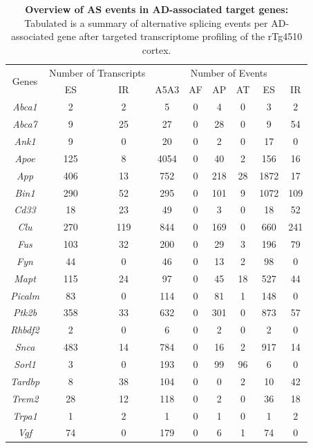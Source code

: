 \begin{table}[]
	\centering
	\captionsetup{width=0.95\textwidth}
	\caption[Overview of AS events in AD-associated target genes]%
	{\textbf{Overview of AS events in AD-associated target genes:} Tabulated is a summary of alternative splicing events per AD-associated gene after targeted transcriptome profiling of the rTg4510 cortex.}
	\label{tab: merged_targeted_ASevents}
	\setlength\tabcolsep{9pt} %
	\begin{tabular}{@{}ccccccccc@{}}
		\toprule
		\multirow{2}{*}{Genes} & \multicolumn{2}{c}{Number of  Transcripts} & \multicolumn{6}{c}{Number of Events} \\ \cmidrule(l){2-9} 
		& ES  & IR  & A5A3 & AF & AP  & AT & ES   & IR  \\ \midrule
		\textit{Abca1}  & 2   & 2   & 5    & 0  & 4   & 0  & 3    & 2   \\
		\textit{Abca7}  & 9   & 25  & 27   & 0  & 28  & 0  & 9    & 54  \\
		\textit{Ank1}   & 9   & 0   & 20   & 0  & 2   & 0  & 17   & 0   \\
		\textit{Apoe}   & 125 & 8   & 4054 & 0  & 40  & 2  & 156  & 16  \\
		\textit{App}    & 406 & 13  & 752  & 0  & 218 & 28 & 1872 & 17  \\
		\textit{Bin1}   & 290 & 52  & 295  & 0  & 101 & 9  & 1072 & 109 \\
		\textit{Cd33}   & 18  & 23  & 49   & 0  & 3   & 0  & 18   & 52  \\
		\textit{Clu}    & 270 & 119 & 844  & 0  & 169 & 0  & 660  & 241 \\
		\textit{Fus}    & 103 & 32  & 200  & 0  & 29  & 3  & 196  & 79  \\
		\textit{Fyn}    & 44  & 0   & 46   & 0  & 13  & 2  & 98   & 0   \\
		\textit{Mapt}   & 115 & 24  & 97   & 0  & 45  & 18 & 527  & 44  \\
		\textit{Picalm} & 83  & 0   & 114  & 0  & 81  & 1  & 148  & 0   \\
		\textit{Ptk2b}  & 358 & 33  & 632  & 0  & 301 & 0  & 873  & 57  \\
		\textit{Rhbdf2} & 2   & 0   & 6    & 0  & 2   & 0  & 2    & 0   \\
		\textit{Snca}   & 483 & 14  & 784  & 0  & 16  & 2  & 917  & 14  \\
		\textit{Sorl1}  & 3   & 0   & 193  & 0  & 99  & 96 & 6    & 0   \\
		\textit{Tardbp} & 8   & 38  & 104  & 0  & 0   & 2  & 10   & 42  \\
		\textit{Trem2}  & 28  & 12  & 118  & 0  & 2   & 0  & 36   & 18  \\
		\textit{Trpa1}  & 1   & 2   & 1    & 0  & 1   & 0  & 1    & 2   \\
		\textit{Vgf}    & 74  & 0   & 179  & 0  & 6   & 1  & 74   & 0   \\ \bottomrule
	\end{tabular}
\end{table}

